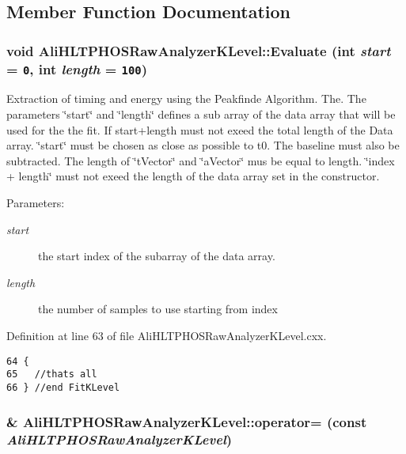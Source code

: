 \subsection{Member Function Documentation}
\subsubsection{\setlength{\rightskip}{0pt plus 5cm}void Ali\-HLTPHOSRaw\-Analyzer\-KLevel::Evaluate (int {\em start} = {\tt 0}, int {\em length} = {\tt 100})\hspace{0.3cm}{\tt  [virtual]}}\label{classAliHLTPHOSRawAnalyzerKLevel_a4}


Extraction of timing and energy using the Peakfinde Algorithm. The. The parameters \char`\"{}start\char`\"{} and \char`\"{}length\char`\"{} defines a sub array of the data array that will be used for the the fit. If start+length must not exeed the total length of the Data array. \char`\"{}start\char`\"{} must be chosen as close as possible to t0. The baseline must also be subtracted. The length of \char`\"{}t\-Vector\char`\"{} and \char`\"{}a\-Vector\char`\"{} mus be equal to length. \char`\"{}index + length\char`\"{} must not exeed the length of the data array set in the constructor. \begin{Desc}
\item[Parameters:]
\begin{description}
\item[{\em start}]the start index of the subarray of the data array. \item[{\em length}]the number of samples to use starting from index \end{description}
\end{Desc}


Definition at line 63 of file Ali\-HLTPHOSRaw\-Analyzer\-KLevel.cxx.

\footnotesize\begin{verbatim}64 {
65   //thats all 
66 } //end FitKLevel
\end{verbatim}\normalsize 


\subsubsection{\& Ali\-HLTPHOSRaw\-Analyzer\-KLevel::operator= (const  {\em Ali\-HLTPHOSRaw\-Analyzer\-KLevel})\hspace{0.3cm}{\tt  [inline]}}\label{classAliHLTPHOSRawAnalyzerKLevel_a2}




